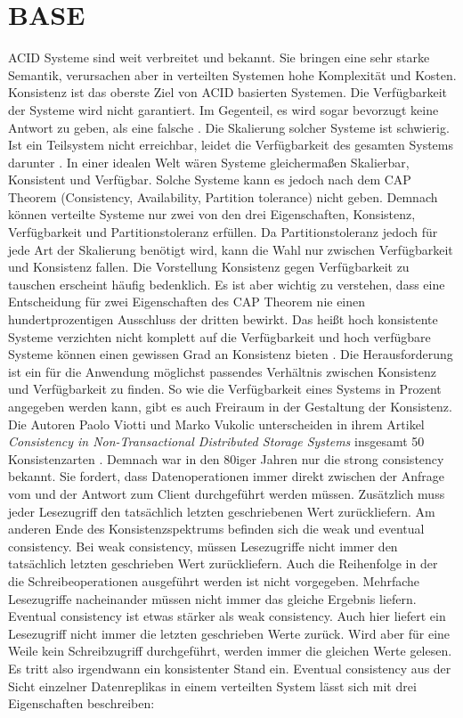 \documentclass[12pt,oneside,a4paper,parskip]{scrbook}
\begin{document}
\section{BASE}
ACID Systeme sind weit verbreitet und bekannt. Sie bringen eine sehr starke Semantik, verursachen aber in verteilten Systemen hohe Komplexität und Kosten. Konsistenz ist das oberste Ziel von ACID basierten Systemen. Die Verfügbarkeit der Systeme wird nicht garantiert. Im Gegenteil, es wird sogar bevorzugt keine Antwort zu geben, als eine falsche \cite{clusterBASE}. Die Skalierung solcher Systeme ist schwierig. Ist ein Teilsystem nicht erreichbar, leidet die Verfügbarkeit des gesamten Systems darunter \cite{BASE}. In einer idealen Welt wären Systeme gleichermaßen Skalierbar, Konsistent und Verfügbar. Solche Systeme kann es jedoch nach dem CAP Theorem (Consistency, Availability, Partition tolerance) nicht geben. Demnach können verteilte Systeme nur zwei von den drei Eigenschaften, Konsistenz, Verfügbarkeit und Partitionstoleranz erfüllen. Da Partitionstoleranz jedoch für jede Art der Skalierung benötigt wird, kann die Wahl nur zwischen Verfügbarkeit und Konsistenz fallen. Die Vorstellung Konsistenz gegen Verfügbarkeit zu tauschen erscheint häufig bedenklich. Es ist aber wichtig zu verstehen, dass eine Entscheidung für zwei Eigenschaften des CAP Theorem nie einen hundertprozentigen Ausschluss der dritten bewirkt.
Das heißt hoch konsistente Systeme verzichten nicht komplett auf die Verfügbarkeit und hoch verfügbare Systeme können einen gewissen Grad an Konsistenz bieten \cite{cap}. Die Herausforderung ist ein für die Anwendung möglichst passendes Verhältnis zwischen Konsistenz und Verfügbarkeit zu finden. So wie die Verfügbarkeit eines Systems in Prozent angegeben werden kann, gibt es auch Freiraum in der Gestaltung der Konsistenz. Die Autoren Paolo Viotti und Marko Vukolic unterscheiden in ihrem Artikel \textit{Consistency in Non-Transactional Distributed Storage Systems} insgesamt 50 Konsistenzarten \cite{consistency}. Demnach war in den 80iger Jahren nur die strong consistency bekannt. Sie fordert, dass Datenoperationen immer direkt zwischen der Anfrage vom und der Antwort zum Client durchgeführt werden müssen. Zusätzlich muss jeder Lesezugriff den tatsächlich letzten geschriebenen Wert zurückliefern. Am anderen Ende des Konsistenzspektrums befinden sich die weak und eventual consistency. Bei weak consistency, müssen Lesezugriffe nicht immer den tatsächlich letzten geschrieben Wert zurückliefern. Auch die Reihenfolge in der die Schreibeoperationen ausgeführt werden ist nicht vorgegeben. Mehrfache Lesezugriffe nacheinander müssen nicht immer das gleiche Ergebnis liefern. Eventual consistency ist etwas stärker als weak consistency. Auch hier liefert ein Lesezugriff nicht immer die letzten geschrieben Werte zurück. Wird aber für eine Weile kein Schreibzugriff durchgeführt, werden immer die gleichen Werte gelesen. Es tritt also irgendwann ein konsistenter Stand ein. Eventual consistency aus der Sicht einzelner Datenreplikas in einem verteilten System lässt sich mit drei Eigenschaften beschreiben:
\end{document}

